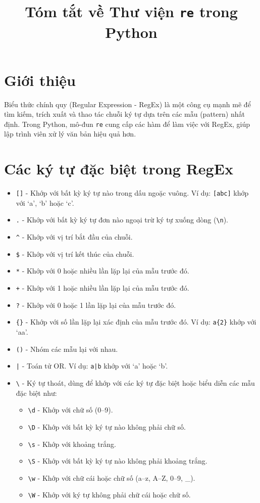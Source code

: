 \documentclass[a4paper,12pt]{article}
\title{Tóm tắt về Thư viện \texttt{re} trong Python}
\author{}
\date{}
\begin{document}
\maketitle

\section*{Giới thiệu}
Biểu thức chính quy (Regular Expression - RegEx) là một công cụ mạnh mẽ để tìm kiếm, trích xuất và thao tác chuỗi ký tự dựa trên các mẫu (pattern) nhất định. Trong Python, mô-đun \texttt{re} cung cấp các hàm để làm việc với RegEx, giúp lập trình viên xử lý văn bản hiệu quả hơn.

\section*{Các ký tự đặc biệt trong RegEx}
\begin{itemize}
    \item \texttt{[]} - Khớp với bất kỳ ký tự nào trong dấu ngoặc vuông. Ví dụ: \texttt{[abc]} khớp với `a', `b' hoặc `c'.
    \item \texttt{.} - Khớp với bất kỳ ký tự đơn nào ngoại trừ ký tự xuống dòng (\texttt{\textbackslash n}).
    \item \texttt{\^{}} - Khớp với vị trí bắt đầu của chuỗi.
    \item \texttt{\$} - Khớp với vị trí kết thúc của chuỗi.
    \item \texttt{*} - Khớp với 0 hoặc nhiều lần lặp lại của mẫu trước đó.
    \item \texttt{+} - Khớp với 1 hoặc nhiều lần lặp lại của mẫu trước đó.
    \item \texttt{?} - Khớp với 0 hoặc 1 lần lặp lại của mẫu trước đó.
    \item \texttt{\{\}} - Khớp với số lần lặp lại xác định của mẫu trước đó. Ví dụ: \texttt{a\{2\}} khớp với `aa'.
    \item \texttt{()} - Nhóm các mẫu lại với nhau.
    \item \texttt{|} - Toán tử OR. Ví dụ: \texttt{a|b} khớp với `a' hoặc `b'.
    \item \texttt{\textbackslash} - Ký tự thoát, dùng để khớp với các ký tự đặc biệt hoặc biểu diễn các mẫu đặc biệt như:
    \begin{itemize}
        \item \texttt{\textbackslash d} - Khớp với chữ số (0--9).
        \item \texttt{\textbackslash D} - Khớp với bất kỳ ký tự nào không phải chữ số.
        \item \texttt{\textbackslash s} - Khớp với khoảng trắng.
        \item \texttt{\textbackslash S} - Khớp với bất kỳ ký tự nào không phải khoảng trắng.
        \item \texttt{\textbackslash w} - Khớp với chữ cái hoặc chữ số (a--z, A--Z, 0--9, \_).
        \item \texttt{\textbackslash W} - Khớp với ký tự không phải chữ cái hoặc chữ số.
    \end{itemize}
\end{itemize}
\end{document}
